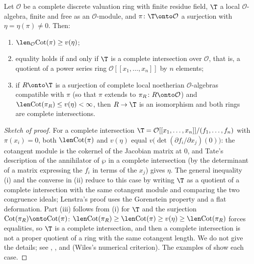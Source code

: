 \begin{theorem}\label{thm:congruence:numerical-criterion}
Let $\mathcal O$ be a complete discrete valuation ring with finite residue field, $\T$ a local $\mathcal O$-algebra, finite and free as an $\mathcal O$-module, and $\pi\colon\T\onto\mathcal O$ a surjection with
$\eta=\eta(\pi)\ne0$. Then:
\begin{enumerate}[label=(\roman*)]
\item $\len_{\mathcal O}\mathrm{Cot}(\pi)\ge v(\eta)$;
\item equality holds if and only if $\T$ is a complete intersection over $\mathcal O$, that is, a quotient of a power series ring $\mathcal O[[x_1,\dots,x_n]]$ by $n$ elements;
\item if $R\onto\T$ is a surjection of complete local noetherian $\mathcal O$-algebras compatible with $\pi$ (so that $\pi$ extends to $\pi_R\colon R\onto\mathcal O$) and
$\len\mathrm{Cot}(\pi_R)\le v(\eta)<\infty$, then $R\to\T$ is an isomorphism and both rings are complete intersections.
\end{enumerate}
\end{theorem}

\begin{proof}[Sketch of proof]
For a complete intersection $\T=\mathcal O[[x_1,\dots,x_n]]/(f_1,\dots,f_n)$ with $\pi(x_i)=0$, both $\len\mathrm{Cot}(\pi)$ and $v(\eta)$ equal $v\bigl(\det(\partial f_i/\partial x_j)(0)\bigr)$: the cotangent module is the
cokernel of the Jacobian matrix at $0$, and Tate's description of the annihilator of $\wp$ in a complete intersection (by the determinant of a matrix expressing the $f_i$ in terms
of the $x_j$) gives $\eta$. The general inequality (i) and the converse in (ii) reduce to this case by writing $\T$ as a quotient of a complete intersection with the same
cotangent module and comparing the two congruence ideals; Lenstra's proof uses the Gorenstein property and a flat deformation. Part (iii) follows from (i) for $\T$ and the
surjection $\mathrm{Cot}(\pi_R)\onto\mathrm{Cot}(\pi)$: $\len\mathrm{Cot}(\pi_R)\ge\len\mathrm{Cot}(\pi)\ge v(\eta)\ge\len\mathrm{Cot}(\pi_R)$ forces equalities, so $\T$ is a complete intersection, and
then a complete intersection is not a proper quotient of a ring with the same cotangent length. We do not give the details; see \cite[Appendix]{Wiles95}, \cite{Lenstra95}, and
\cite[Section 5]{DDT} (Wiles's numerical criterion). The examples of  show each case.
\end{proof}

